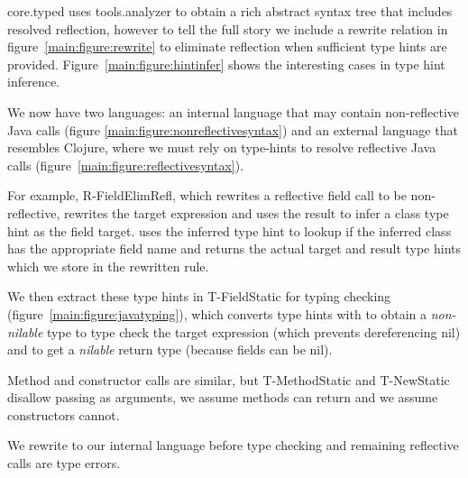 core.typed uses tools.analyzer to obtain a rich abstract syntax tree that includes resolved
reflection, however to tell the full story we include a rewrite relation 
in figure~\ref{main:figure:rewrite} to eliminate reflection when sufficient type hints are provided.
Figure~\ref{main:figure:hintinfer} shows the interesting cases in type hint inference.

We now have two languages: an internal language that may contain non-reflective Java calls (figure 
  \ref{main:figure:nonreflectivesyntax}) 
  and an external language that resembles Clojure, where we must rely on type-hints to resolve
  reflective Java calls (figure~\ref{main:figure:reflectivesyntax}).

For example, R-FieldElimRefl, which rewrites a reflective field call to be non-reflective,
rewrites the target expression and uses the result to infer a class type hint as the field target.
\fieldtypeliteral{} uses the inferred type hint to lookup if the inferred class has the appropriate
field name and returns the actual target and result type hints which we store in the rewritten rule.

We then extract these type hints in T-FieldStatic for typing checking 
(figure~\ref{main:figure:javatyping}), which converts type hints
with \javatotcliteral{} to obtain a \emph{non-nilable} type to type check the target expression (which prevents
dereferencing nil) and \javatotcnilliteral{} to get a \emph{nilable} return type (because fields can be nil).

Method and constructor calls are similar, but T-MethodStatic and T-NewStatic disallow passing \nil{} as arguments, 
we assume methods can return \nil{} and we assume constructors cannot.

We rewrite to our internal language before type checking and remaining reflective calls are type errors.




{}
